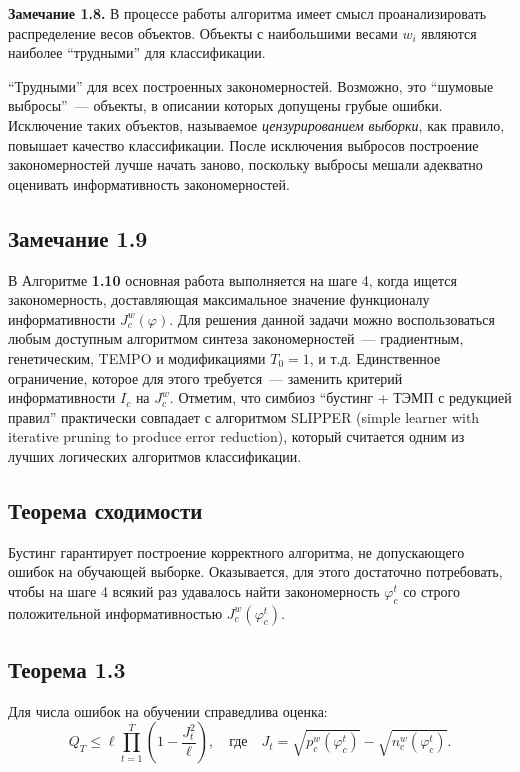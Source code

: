 \textbf{Замечание 1.8.} В процессе работы алгоритма имеет смысл проанализировать распределение весов объектов. Объекты с наибольшими весами $w_i$ являются наиболее ``трудными'' для классификации.

``Трудными'' для всех построенных закономерностей. Возможно, это ``шумовые выбросы''~--- объекты, в описании которых допущены грубые ошибки. Исключение таких объектов, называемое \textit{цензурированием выборки}, как правило, повышает качество классификации. После исключения выбросов построение закономерностей лучше начать заново, поскольку выбросы мешали адекватно оценивать информативность закономерностей.

\subsection*{Замечание 1.9}
В Алгоритме \textbf{1.10} основная работа выполняется на шаге 4, когда ищется закономерность, доставляющая максимальное значение функционалу информативности $J_c^w(\varphi)$. Для решения данной задачи можно воспользоваться любым доступным алгоритмом синтеза закономерностей~--- градиентным, генетическим, TEMPO и модификациями $T_0 = 1$, и т.д. Единственное ограничение, которое для этого требуется~--- заменить критерий информативности $I_c$ на $J_c^w$. Отметим, что симбиоз ``бустинг + ТЭМП с редукцией правил'' практически совпадает с алгоритмом SLIPPER (simple learner with iterative pruning to produce error reduction), который считается одним из лучших логических алгоритмов классификации.

\subsection*{Теорема сходимости}
Бустинг гарантирует построение корректного алгоритма, не допускающего ошибок на обучающей выборке. Оказывается, для этого достаточно потребовать, чтобы на шаге 4 всякий раз удавалось найти закономерность $\varphi_c^t$ со строго положительной информативностью $J_c^w(\varphi_c^t)$.

\subsection*{Теорема 1.3}
Для числа ошибок на обучении справедлива оценка:
\begin{equation}
    Q_T \leq \ell \prod_{t=1}^T \left( 1 - \frac{J_t^2}{\ell} \right), \quad \text{где} \quad J_t = \sqrt{p_c^w(\varphi_c^t)} - \sqrt{n_c^w(\varphi_c^t)}.
    \label{eq:convergence}
\end{equation}

